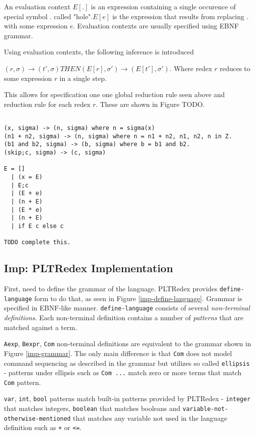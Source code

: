 An evaluation context $E[.]$ is an expression containing a single occurence of special symbol $.$ called "hole".$E[e]$ is the expression that results from replacing $.$ with some expression $e$. Evaluation contexts are usually specified using EBNF grammar. 

Using evaluation contexts, the following inference is introduced

$(r, \sigma) \rightarrow (t\prime, \sigma) THEN (E[r], \sigma\prime) \rightarrow (E[t\prime], \sigma\prime)$. Where redex $r$ reduces to some expression $r$ in a single step.

This allows for specification one one global reduction rule seen above and reduction rule for each redex $r$. These are shown in Figure TODO.

\begin{lstlisting}

(x, sigma) -> (n, sigma) where n = sigma(x)
(n1 + n2, sigma) -> (n, sigma) where n = n1 + n2, n1, n2, n in Z.
(b1 and b2, sigma) -> (b, sigma) where b = b1 and b2.
(skip;c, sigma) -> (c, sigma)

E = []
  | (x = E)
  | E;c
  | (E + e)
  | (n + E)
  | (E * e)
  | (n + E)
  | if E c else c
 
TODO complete this.
\end{lstlisting}


\subsection{Imp: PLTRedex Implementation}

First, need to define the grammar of the language. PLTRedex provides \texttt{define-language} form to do that, as seen in Figure \ref{imp-define-language}. Grammar is specified in EBNF-like manner. \texttt{define-language} consists of several \textit{non-terminal definitions}. Each non-terminal definition contains a number of \textit{patterns} that are matched against a term. 

\texttt{Aexp}, \texttt{Bexpr}, \texttt{Com} non-terminal definitions are equivalent to the grammar shown in Figure \ref{imp-grammar}. The only main difference is that \texttt{Com} does not model command sequencing as described in the grammar but utilizes so called \texttt{ellipsis} - patterns under ellipsis such as \texttt{Com ...} match zero or more terms that match \texttt{Com} pattern.

\texttt{var}, \texttt{int}, \texttt{bool} patterns match built-in patterns provided by PLTRedex - \texttt{integer} that matches integers, \texttt{boolean} that matches booleans and \texttt{variable-not-otherwise-mentioned} that matches any variable not used in the language definition such as \texttt{+} or \texttt{<=}.

